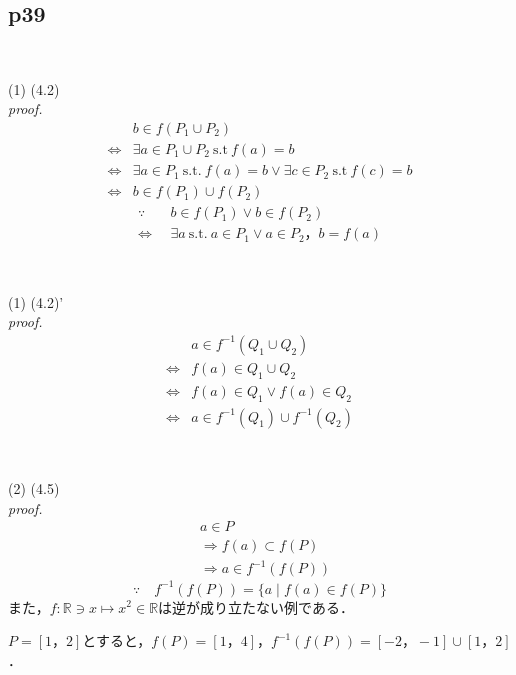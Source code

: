 \documentclass[dvipdfmx,uplatex,11pt]{jsarticle}
\begin{document}
\subsection{p39}
​
\begin{screen}
    (1) \quad (4.2) \\
{\it proof.}
\begin{align*}
    & b \in f(P_1 \cup P_2) \\
    \iff & \exists a \in P_1 \cup P_2 ~ \mathrm{s.t} ~ f(a)=b \\
    \iff & \exists a \in P_1 ~\mathrm{s.t.} ~ f(a)=b \lor \exists c \in P_2 ~ \mathrm{s.t} ~ f(c)=b \\
    \iff & b \in f(P_1) \cup f(P_2) 
\end{align*}
\dotfill 
\begin{align*}
\because  \quad  & b \in f(P_1) \lor b \in f(P_2) \\
\iff & \exists a ~ \mathrm{s.t.} ~ a \in P_1 \lor a \in P_2 ，b = f(a)
\end{align*}
\end{screen}
​
\begin{screen}
    (1) \quad (4.2)' \\
    {\it proof.}
\begin{align*}
    & a \in f^{-1} (Q_1 \cup Q_2) \\
    \iff & f(a) \in Q_1 \cup Q_2 \\
    \iff & f(a)  \in Q_1 \lor f(a) \in Q_2 \\
    \iff & a \in f^{-1} (Q_1) \cup f^{-1} (Q_2)
\end{align*}
\end{screen}
​
\begin{screen}
    (2) \quad (4.5) \\
    {\it proof.}
    \begin{align*}
        & a \in P \\
       & \Longrightarrow  f(a) \subset f(P) \\
       & \Longrightarrow a \in f^{-1} (f(P))
    \end{align*}
    \dotfill 
    \[
        \because \quad f^{-1} (f(P)) = \{ a \mid f(a)\in f(P)\}
        \]
    また，$f \colon \mathbb{R} \ni x \mapsto x^2 \in \mathbb{R}$は逆が成り立たない例である．\par
    $P=[1，2]$とすると，$f(P)=[1，4]$，$f^{-1}(f(P))=[-2，-1] \cup [1，2]$．
\end{screen}
\end{document}
